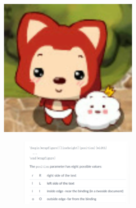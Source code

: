 \documentclass[12pt, a4paper]{article}
\begin{document}
\includegraphics[scale=0.2, angle=45]{favicon.png}

\begin{figure} %
    \centering
    \includegraphics[width=0.5\textwidth]{wrap_figure.png}
\end{figure}
\end{document}
